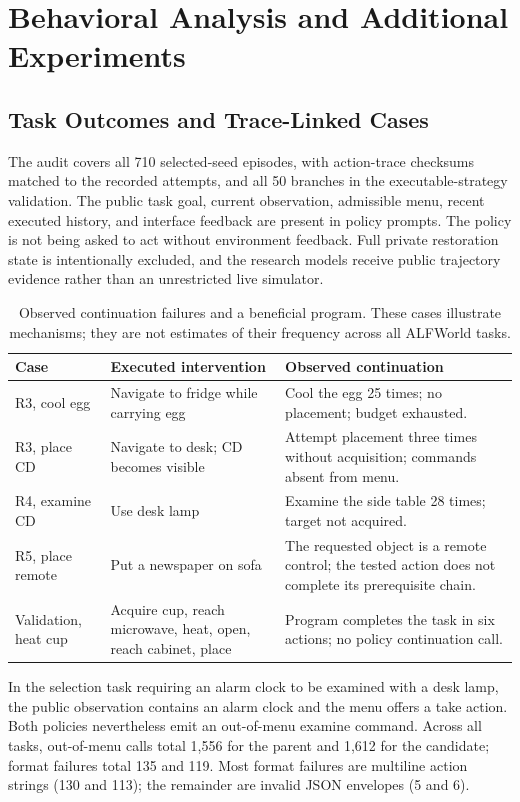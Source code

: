 \section{Behavioral Analysis and Additional Experiments}
\label{app:additional}
\subsection{Task Outcomes and Trace-Linked Cases}
\label{app:behavior}
The audit covers all 710 selected-seed episodes, with action-trace
checksums matched to the recorded attempts, and all 50 branches in the
executable-strategy validation. The public task goal, current observation,
admissible menu, recent executed history, and interface feedback are
present in policy prompts. The policy is not being asked to act without
environment feedback. Full private restoration state is intentionally
excluded, and the research models receive public trajectory evidence
rather than an unrestricted live simulator.

\begin{table}[!htbp]
\caption{Observed continuation failures and a beneficial program.
These cases illustrate mechanisms; they are not estimates of their
frequency across all ALFWorld tasks.}
\centering\small
\begin{tabularx}{\linewidth}{L{0.85in}XX}\toprule
Case & Executed intervention & Observed continuation\\\midrule
R3, cool egg & Navigate to fridge while carrying egg & Cool the egg 25 times; no placement; budget exhausted.\\
R3, place CD & Navigate to desk; CD becomes visible & Attempt placement three times without acquisition; commands absent from menu.\\
R4, examine CD & Use desk lamp & Examine the side table 28 times; target not acquired.\\
R5, place remote & Put a newspaper on sofa & The requested object is a remote control; the tested action does not complete its prerequisite chain.\\
Validation, heat cup & Acquire cup, reach microwave, heat, open, reach cabinet, place & Program completes the task in six actions; no policy continuation call.\\\bottomrule
\end{tabularx}
\end{table}

In the selection task requiring an alarm clock to be examined with a
desk lamp, the public observation contains an alarm clock and the menu
offers a take action. Both policies nevertheless emit an out-of-menu
examine command. Across all tasks, out-of-menu calls total 1,556 for the
parent and 1,612 for the candidate; format failures total 135 and 119.
Most format failures are multiline action strings (130 and 113);
the remainder are invalid JSON envelopes (5 and 6).

